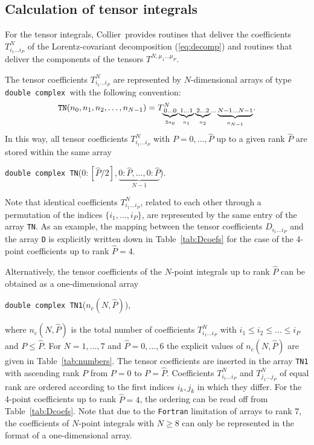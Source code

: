 \documentclass[preprint,sort&compress,12pt]{elsarticle}
\def\beq{\begin{equation}}
\def\eeq{\end{equation}}
\def\refeq#1{\mbox{(\ref{#1})}}
\def\refta#1{\mbox{Table~\ref{#1}}}
\newcommand{\collier}{{\sc Collier}}
\newcommand{\sst}{\scriptstyle}
\begin{document}
\subsection{Calculation of tensor integrals}
\label{subsec:CalcTen}

For the tensor integrals, \collier\ provides routines
that deliver the coefficients $T^N_{i_1\dots i_P}$ of the Lorentz-covariant 
decomposition \refeq{eq:decomp} and routines that deliver the 
components of the tensors
$T^{N,\mu_1\ldots\mu_P}$. 

The tensor coefficients $T^N_{i_1\dots i_P}$ are represented by
$N$-dimensional arrays of type {\tt double complex }with the following
convention:
\beq
{\tt TN}(n_0,n_1,n_2,\ldots,n_{N-1})=
 T^N_{\underbrace{\sst 0\ldots0}_{2n_0}
\underbrace{\sst 1\ldots1}_{n_1}
\underbrace{\sst 2\ldots2}_{n_2}
\ldots
\underbrace{\sst N-1\ldots N-1}_{n_{N-1}}}.
\eeq
In this way, all tensor coefficients $T^{N}_{i_1\ldots i_P}$ with
$P=0,\ldots,\widehat{P}$ up to a given rank $\widehat{P}$ are stored
within the same array
\begin{center}
  {\tt double complex TN}($0\!:\![\widehat{P}/2],
                          \underbrace{0\!:\!\widehat{P},\ldots,0\!:\!\widehat{P}}_{N-1}$). 
\end{center}
Note that identical coefficients $T^N_{i_1\ldots i_P}$, related to
each other through a permutation of the indices $\{i_1,\ldots,i_P\}$,
are represented by the same entry of the array {\tt TN}.  As an
example, the mapping between the tensor coefficients $D_{i_1\ldots
  i_P}$ and the
array {\tt D} is explicitly written down in \refta{tab:Dcoefs} 
for the case of the 4-point coefficients up to rank $\widehat{P}=4$. 

Alternatively, the tensor coefficients of the $N$-point integrals up
to rank $\widehat{P}$ can be obtained as a one-dimensional array
\begin{center}
  {\tt double complex TN1}($n_{c}(N,\widehat{P})$), 
\end{center}
where $n_{c}(N,\widehat{P})$ is the total number of coefficients $T^{N}_{i_1\ldots i_P}$
with $i_1\le i_2\le \ldots\le i_P$ and $P\le \widehat{P}$. For $N=1,\ldots,7$ and $\widehat{P}=0,\ldots,6$
the explicit values of $n_{c}(N,\widehat{P})$ are given in \refta{tab:numbers}. The tensor coefficients
are inserted in the array {\tt TN1} with ascending rank $P$ from $P=0$ to $P=\widehat{P}$. 
Coefficients $T^{N}_{i_1\ldots i_P}$ and 
${T}^{N}_{j_1\ldots j_P}$ of equal rank are ordered 
according to the first indices 
$i_k,j_k$ in which they differ. For the 4-point coefficients up to
rank $\widehat{P}=4$, the ordering can be read off from
\refta{tab:Dcoefs}. Note that due to the
{\tt Fortran} limitation of arrays to rank 7, the coefficients of $N$-point integrals with $N\ge 8$ can only be
represented in the format of a one-dimensional array.
\end{document}
